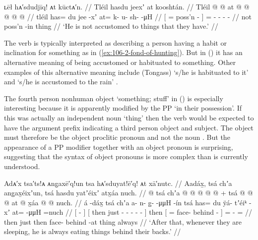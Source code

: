 \ex\label{ex:106-14-doesnt-like-things}%
%
\begingl
	\glpreamble	ʟēł hᴀ′sdudjīq! ᴀt kūctᴀ′n. //
	\glpreamble	Tléil hasdu jeexʼ at kooshtán. //
	\gla	Tléil {}  @ {}  @ {} {} at @  @ {} @ {} @ {} @ {} //
	\glb	tléil {} has= du jee -xʼ {} at= k- u- sh-  -μH //
	\glc	{} {}[ =  poss’n - {}]
			= - - -  - //
	\gld	not {}  {} poss’n -in {} thing  {} {} {} {} //
	\glft	‘He is not accustomed to things that they have.’
		//
\endgl
\xe

The verb  is typically interpreted as describing a person having a habit or inclination for something as in (\ref{ex:106-2-fond-of-hunting}).
But in (\lastx) it has an alternative meaning of being accustomed or habituated to something.
Other examples of this alternative meaning include (Tongass)  ‘s/he is habituated to it’ \parencite[06/57]{leer:1973} and  ‘s/he is accustomed to the rain’ \parencite[372]{leer:1976}.

The fourth person nonhuman object  ‘something; stuff’ in (\lastx) is especially interesting because it is apparently modified by the PP  ‘in their possession’.
If this was actually an independent noun  ‘thing’ then the verb would be expected to have the  argument prefix indicating a third person object and subject.
The object must therefore be the object proclitic pronoun  and not the noun .
But the appearance of a PP modifier together with an object pronoun is surprising, suggesting that the syntax of object pronouns is more complex than is currently understood.

\ex\label{ex:106-15-secretly-eating}%
%
\begingl
	\glpreamble	Adᴀ′x tsa′ts!ᴀ ᴀng̣axē′q!un tsa hᴀ′sduyat!ē′q! ᴀt xā′nutc. //
	\glpreamble	Aadáx̱, tsá chʼa ang̱ax̱éixʼun, tsá hasdu yatʼéixʼ atx̱áa nuch. //
	\gla	{}  @ {} {} 
			{} tsá chʼa  @ {} @ {} @ {} @ {} @ {} {} +
			tsá {}  @ {}  @ {} @ {} {}
			at @ x̱áa @ {} @ \•nuch. //
	\glb	{} á -dáx̱ {}
			{} tsá chʼa a- n- g̱-  -μμH -ín {}
			tsá {} has= du ÿá- tʼéiᵏ -xʼ {}
			at=  -μμH =nuch //
	\glc	{}[  - {}]
			{}[ then just - - -  - - {}]
			then {}[ =  face- behind - {}]
			=  - = //
	\gld	{}  {} {}
			{} then just  {} {} {} {} {} {}
			then {}  {} face- behind -at {}
			thing  {} \•always //
	\glft	‘After that, whenever they are sleeping, he is always eating things behind their backs.’
		//
\endgl
\xe

